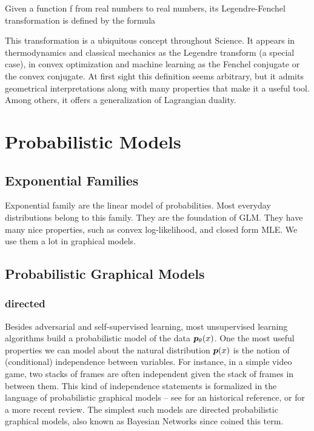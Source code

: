 Given a function f from real numbers to real numbers, its Legendre-Fenchel transformation is defined by the formula
 
This transformation is a ubiquitous concept throughout Science. It appears in thermodynamics and classical mechanics as the Legendre transform (a special case), in convex optimization and machine learning as the Fenchel conjugate or the convex conjugate. At first sight this definition seems arbitrary, but it admits geometrical interpretations along with many properties that make it a useful tool. Among others, it offers a generalization of Lagrangian duality.

\section{Probabilistic Models}
\subsection{Exponential Families}
\label{ssec:exponential-families}
Exponential family are the linear model of probabilities. 
Most everyday distributions belong to this family.
They are the foundation of GLM.
They have many nice properties, such as convex log-likelihood, and closed form MLE.
We use them a lot in graphical models. 

\subsection{Probabilistic Graphical Models}
\label{ssec:PGM}
\subsubsection{directed} 
Besides adversarial and self-supervised learning, most unsupervised learning algorithms build a probabilistic model of the data $\bm{p}_{\theta}(x)$.
One the most useful properties we can model about the natural distribution $\bm{p}(x)$ is the notion of (conditional) independence between variables. For instance, in a simple video game, two stacks of frames are often independent given the stack of frames in between them. This kind of independence statements is formalized in the language of probabilistic graphical models -- see \citet{pearl1988probabilistic} for an historical reference, or  \citet{koller2009probabilistic} for a more recent review. The simplest such models are directed probabilistic graphical models, also known as Bayesian Networks since \citet{pearl1985bayesian} coined this term.

